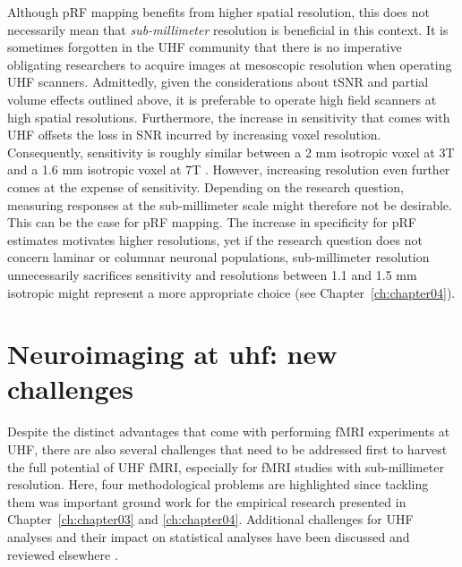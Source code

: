 Although pRF mapping benefits from higher spatial resolution, this does not necessarily mean that \textit{sub-millimeter} resolution is beneficial in this context. It is sometimes forgotten in the UHF community that there is no imperative obligating researchers to acquire images at mesoscopic resolution when operating UHF scanners. Admittedly, given the considerations about tSNR and partial volume effects outlined above, it is preferable to operate high field scanners at high spatial resolutions. Furthermore, the increase in sensitivity that comes with UHF offsets the loss in SNR incurred by increasing voxel resolution. Consequently, sensitivity is roughly similar between a 2 mm isotropic voxel at 3T and a 1.6 mm isotropic voxel at 7T \parencite{DeMartino2016}. However, increasing resolution even further comes at the expense of sensitivity. Depending on the research question, measuring responses at the sub-millimeter scale might therefore not be desirable. This can be the case for pRF mapping. The increase in specificity for pRF estimates motivates higher resolutions, yet if the research question does not concern laminar or columnar neuronal populations, sub-millimeter resolution unnecessarily sacrifices sensitivity and resolutions between 1.1 and 1.5 mm isotropic might represent a more appropriate choice (see Chapter~\ref{ch:chapter04}).

\section{Neuroimaging at uhf: new challenges}
Despite the distinct advantages that come with performing fMRI experiments at UHF, there are also several challenges that need to be addressed first to harvest the full potential of UHF fMRI, especially for fMRI studies with sub-millimeter resolution. Here, four methodological problems are highlighted since tackling them was important ground work for the empirical research presented in Chapter~\ref{ch:chapter03} and \ref{ch:chapter04}. Additional challenges for UHF analyses and their impact on statistical analyses have been discussed and reviewed elsewhere \parencite{Polimeni2017, DeMartino2016}.

